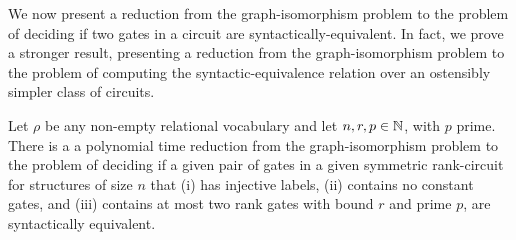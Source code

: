 \documentclass[../paper.tex]{subfiles}
\begin{document}

We now present a reduction from the graph-isomorphism problem to the problem of
deciding if two gates in a circuit are syntactically-equivalent. In fact, we
prove a stronger result, presenting a reduction from the graph-isomorphism
problem to the problem of computing the syntactic-equivalence relation over an
ostensibly simpler class of circuits.

\begin{prop}
  Let $\rho$ be any non-empty relational vocabulary and let $n, r, p \in \mathbb{N}$,
  with $p$ prime. There is a a polynomial time reduction from the
  graph-isomorphism problem to the problem of deciding if a given pair of gates
  in a given symmetric rank-circuit for structures of size $n$ that (i) has
  injective labels, (ii) contains no constant gates, and (iii) contains at most
  two rank gates with bound $r$ and prime $p$, are syntactically equivalent.
  \label{prop:syntactic-graph-iso}
\end{prop}
\end{document}
